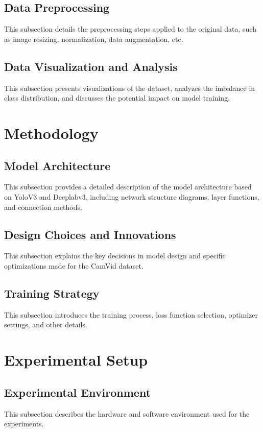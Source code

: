 \documentclass[conference]{IEEEtran}
\begin{document}
\subsection{Data Preprocessing}
This subsection details the preprocessing steps applied to the original data, such as image resizing, normalization, data augmentation, etc.

\subsection{Data Visualization and Analysis}
This subsection presents visualizations of the dataset, analyzes the imbalance in class distribution, and discusses the potential impact on model training.

\section{Methodology}
\subsection{Model Architecture}
This subsection provides a detailed description of the model architecture based on YoloV3 and Deeplabv3, including network structure diagrams, layer functions, and connection methods.

\subsection{Design Choices and Innovations}
This subsection explains the key decisions in model design and specific optimizations made for the CamVid dataset.

\subsection{Training Strategy}
This subsection introduces the training process, loss function selection, optimizer settings, and other details.

\section{Experimental Setup}
\subsection{Experimental Environment}
This subsection describes the hardware and software environment used for the experiments.
\end{document}
